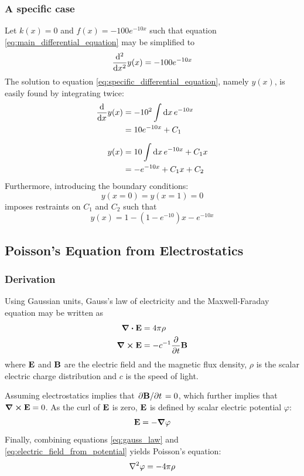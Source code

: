 \documentclass[reprint,english]{revtex4-1}
\begin{document}
\subsubsection{A specific case}\label{sec:specific_case}
Let \(k(x)=0\) and \(f(x)=-100e^{-10x}\) such that equation \ref{eq:main_differential_equation} may be simplified to
\begin{equation}\label{eq:specific_differential_equation}
\dv[2]{x}y(x)=-100e^{-10x}
\end{equation}
The solution to equation \eqref{eq:specific_differential_equation}, namely \(y(x)\), is easily found by integrating twice:
\begin{align}
\dv{x}y(x)&=-10^2\int\dd{x}e^{-10x}\nonumber\\
&=10e^{-10x}+C_1\nonumber\\[2mm]
y(x)&=10\int\dd{x}e^{-10x}+C_1x\nonumber\\
&=-e^{-10x}+C_1x+C_2\label{eq:general_solution_to_specific}
\end{align}
Furthermore, introducing the boundary conditions:
\[y(x=0)=y(x=1)=0\]
imposes restraints on \(C_1\) and \(C_2\) such that
\begin{equation}\label{eq:specific_solution_to_specific}
y(x)=1-(1-e^{-10})x-e^{-10x}
\end{equation}
\subsection{Poisson's Equation from Electrostatics}\label{sec:poisson_equation}
\subsubsection{Derivation}
Using Gaussian units, Gauss's law of electricity and the Maxwell-Faraday equation may be written as
\begin{align}
\div\vb{E}&=4\pi\rho\label{eq:gauss_law}\\
\curl\vb{E}&=-c^{-1}\pdv{t}\vb{B}\label{eq:maxwell-farady_equation}
\end{align}
where \(\vb{E}\) and \(\vb{B}\) are the electric field and the magnetic flux density, \(\rho\) is the scalar electric charge distribution and \(c\) is the speed of light.

Assuming electrostatics implies that \(\pdv*{\vb{B}}{t}=0\), which further implies that \(\curl\vb{E}=0\). As the curl of \(\vb{E}\) is zero, \(\vb{E}\) is defined by scalar electric potential \(\varphi\):
\begin{equation}\label{eq:electric_field_from_potential}
\vb{E}=-\grad\varphi
\end{equation}
Finally, combining equations \eqref{eq:gauss_law} and \eqref{eq:electric_field_from_potential} yields Poisson's equation:
\begin{equation}\label{eq:poisson_equation_electrostatics}
\laplacian\varphi=-4\pi\rho
\end{equation}
\newpage
\end{document}
